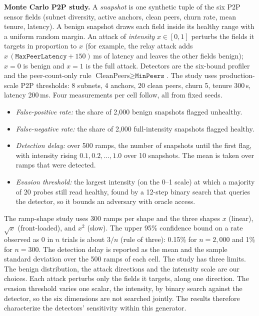 \textbf{Monte Carlo P2P study.} A \emph{snapshot} is one synthetic tuple of
the six P2P sensor fields (subnet diversity, active anchors, clean peers,
churn rate, mean tenure, latency). A benign snapshot draws each field inside its healthy range
with a uniform random margin. An attack of \emph{intensity}
$x\in[0,1]$ perturbs the fields it targets in proportion to $x$ (for
example, the relay attack adds $x\,(\texttt{MaxPeerLatency}{+}150)$\,ms of
latency and leaves the other fields benign); $x=0$ is benign and $x=1$ is
the full attack. Detectors are the six-bound profiler and the
peer-count-only rule $\text{CleanPeers}\ge\texttt{MinPeers}$. The study uses
production-scale P2P thresholds: 8 subnets, 4 anchors, 20 clean peers, churn
5, tenure 300\,s, latency 200\,ms. Four measurements per cell follow, all
from fixed seeds.
\begin{itemize}
  \item \emph{False-positive rate:} the share of 2{,}000 benign snapshots
  flagged unhealthy.
  \item \emph{False-negative rate:} the share of 2{,}000 full-intensity
  snapshots flagged healthy.
  \item \emph{Detection delay:} over 500 ramps, the number of snapshots until
  the first flag, with intensity rising $0.1,0.2,\ldots,1.0$ over 10
  snapshots. The mean is taken over ramps that were detected.
  \item \emph{Evasion threshold:} the largest intensity (on the 0--1 scale)
  at which a majority of 20 probes still read healthy, found by a 12-step
  binary search that queries the detector, so it bounds an adversary with
  oracle access.
\end{itemize}
The ramp-shape study uses 300 ramps per shape and the three shapes
$x$ (linear), $\sqrt{x}$ (front-loaded), and $x^2$ (slow). The upper 95\% confidence bound on a
rate observed as 0 in $n$ trials is about $3/n$ (rule of three): 0.15\% for
$n=2{,}000$ and 1\% for $n=300$.
The detection delay is reported as the mean and the sample standard
deviation over the 500 ramps of each cell.
The study has three limits. The benign distribution, the attack directions and
the intensity scale are our choices. Each attack perturbs only the fields it
targets, along one direction. The evasion threshold varies one scalar, the
intensity, by binary search against the detector, so the six dimensions are not
searched jointly. The results therefore characterize the detectors' sensitivity
within this generator.


